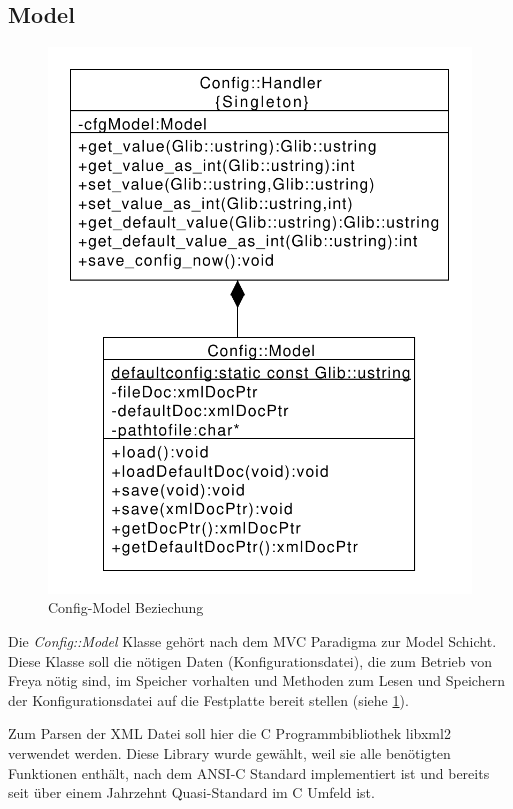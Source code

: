 \subsection{Model}
\begin{figure}[htb!]
    \centering
    \includegraphics[scale=0.6]{./gfx/class/hand_model}
    \caption{Config-Model Beziechung}
    \label{c_confmod}
\end{figure}
Die \emph{Config::Model} Klasse gehört nach dem MVC Paradigma zur Model Schicht. Diese Klasse soll die nötigen Daten (Konfigurationsdatei),
die zum Betrieb von Freya nötig sind, im Speicher vorhalten und Methoden zum Lesen und Speichern der Konfigurationsdatei auf die Festplatte bereit stellen (siehe \ref{c_confmod}).



Zum Parsen der XML Datei soll hier die C Programmbibliothek libxml2 verwendet werden. Diese Library wurde gewählt, weil sie alle benötigten Funktionen enthält, nach dem ANSI-C Standard implementiert ist
und bereits seit über einem Jahrzehnt Quasi-Standard im C Umfeld ist.

